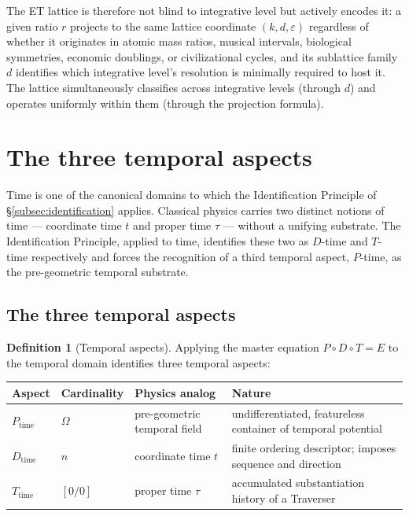\documentclass[11pt,a4paper]{article}
\theoremstyle{definition}
\newtheorem{definition}[theorem]{Definition}
\theoremstyle{remark}
\newcommand{\PDT}{\ensuremath{P{\circ}D{\circ}T}}
\begin{document}
The ET lattice is therefore not blind to integrative level but actively encodes it: a given ratio $r$ projects to the same lattice coordinate $(k,d,\varepsilon)$ regardless of whether it originates in atomic mass ratios, musical intervals, biological symmetries, economic doublings, or civilizational cycles, and its sublattice family $d$ identifies which integrative level's resolution is minimally required to host it. The lattice simultaneously classifies across integrative levels (through $d$) and operates uniformly within them (through the projection formula).

\section{The three temporal aspects}\label{sec:temporal}

Time is one of the canonical domains to which the Identification Principle of \S\ref{subsec:identification} applies. Classical physics carries two distinct notions of time --- coordinate time $t$ and proper time $\tau$ --- without a unifying substrate. The Identification Principle, applied to time, identifies these two as $D$-time and $T$-time respectively and forces the recognition of a third temporal aspect, $P$-time, as the pre-geometric temporal substrate.

\subsection{The three temporal aspects}

\begin{definition}[Temporal aspects]\label{def:temporal-aspects}
Applying the master equation $\PDT = E$ to the temporal domain identifies three temporal aspects:

\begin{center}
\begin{tabularx}{\textwidth}{@{}llXX@{}}
\toprule
\textbf{Aspect} & \textbf{Cardinality} & \textbf{Physics analog} & \textbf{Nature}\\
\midrule
$P_{\text{time}}$ & $\Omega$ & pre-geometric temporal field
  & undifferentiated, featureless container of temporal potential\\
$D_{\text{time}}$ & $n$ & coordinate time $t$
  & finite ordering descriptor; imposes sequence and direction\\
$T_{\text{time}}$ & $[0/0]$ & proper time $\tau$
  & accumulated substantiation history of a Traverser\\
\bottomrule
\end{tabularx}
\end{center}
\end{definition}
\end{document}
